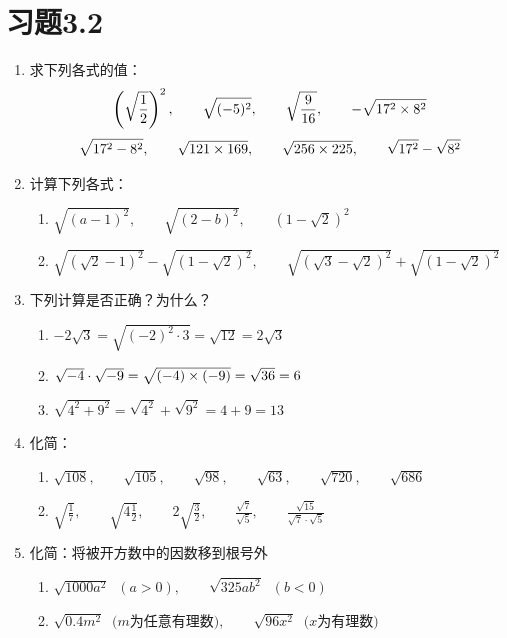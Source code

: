 \section*{习题3.2}
\begin{enumerate}
    \item 求下列各式的值：
\[\left(\sqrt{\dfrac{1}{2}}\right)^2,\qquad \sqrt{(-5)^2},\qquad \sqrt{\dfrac{9}{16}},\qquad -\sqrt{17^2\times 8^2}  \]
\[\sqrt{17^2-8^2},\qquad \sqrt{121\times 169},\qquad \sqrt{256\times 225},\qquad \sqrt{17^2}-\sqrt{8^2}\]

\item 计算下列各式：
\begin{enumerate}
    \item $\sqrt{(a-1)^2},\qquad \sqrt{(2-b)^2},\qquad \left(1-\sqrt{2}\right)^2$
    \item $\sqrt{\left(\sqrt{2}-1\right)^2}-\sqrt{\left(1-\sqrt{2}\right)^2},\qquad \sqrt{\left(\sqrt{3}-\sqrt{2}\right)^2}+\sqrt{\left(1-\sqrt{2}\right)^2}$
\end{enumerate}

\item 下列计算是否正确？为什么？
\begin{enumerate}
    \item $-2\sqrt{3}=\sqrt{(-2)^2\cdot 3}=\sqrt{12}=2\sqrt{3}$
    \item $\sqrt{-4}\cdot \sqrt{-9}=\sqrt{(-4)\times(-9)}=\sqrt{36}=6$
    \item $\sqrt{4^2+9^2}=\sqrt{4^2}+\sqrt{9^2}=4+9=13$
\end{enumerate}

\item 化简：
\begin{enumerate}
    \item $\sqrt{108},\qquad \sqrt{105},\qquad \sqrt{98},\qquad \sqrt{63},\qquad \sqrt{720},\qquad \sqrt{686}$
    \item $\sqrt{\frac{1}{7}},\qquad \sqrt{4\frac{1}{2}},\qquad 2\sqrt{\frac{3}{2}},\qquad \frac{\sqrt{7}}{\sqrt{5}},\qquad \frac{\sqrt{15}}{\sqrt{7}\cdot \sqrt{5}}$
\end{enumerate}

\item 化简：将被开方数中的因数移到根号外
\begin{enumerate}
    \item $\sqrt{1000a^2}\;\; (a>0),\qquad \sqrt{325ab^2}\;\; (b<0)$
    \item $\sqrt{0.4m^2}\;\; \text{($m$为任意有理数)},\qquad \sqrt{96x^2}\;\;\text{($x$为有理数)}$
\end{enumerate}


\end{enumerate}
